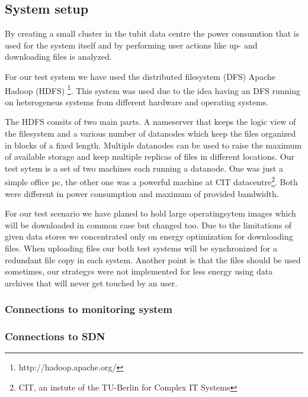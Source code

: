 
\subsection{System setup}

By creating a small cluster in the tubit data centre the power consumtion that is used for the system itself and by performing user actions like up- and downloading files is analyzed.

For our test system we have used the distributed filesystem (DFS) Apache Hadoop\textsuperscript{\textregistered} (HDFS) \footnote{http://hadoop.apache.org/}. This system was used due to the idea having an DFS running on heterogeneus systems from different hardware and operating systems. 

The HDFS consits of two main parts. A nameserver that keeps the logic view of the filesystem and a various number of datanodes which keep the files organized in blocks of a fixed length. Multiple datanodes can be used to raise the maximum of available storage and keep multiple replicas of files in different locations. Our test sytem is a set of two machines each running a datanode. One was just a simple office pc, the other one was a powerful machine at CIT datacentre\footnote{CIT, an instute of the TU-Berlin for Complex IT Systems}. Both were different in power consumption and maximum of provided bandwidth.


For our test scenario we have planed to hold large operatingsytem images which will be downloaded in common case but changed too. Due to the limitations of given data stores we concentrated only on energy optimization for downloading files. When uploading files our both test systems will be synchronized for a redundant file copy in each system.
Another point is that the files should be used sometimes, our strategys were not implemented for less energy using data archives that will never get touched by an user.

\subsubsection{Connections to monitoring system}

\subsubsection{Connections to SDN}

